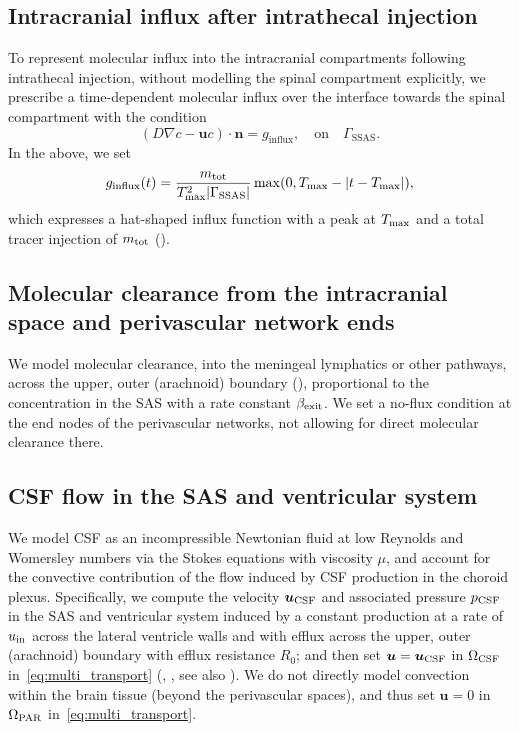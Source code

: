 \documentclass[fleqn,10pt]{wlscirep}
\begin{document}
\subsection*{Intracranial influx after intrathecal injection}
To represent molecular influx into the intracranial compartments
following intrathecal injection, without modelling the spinal
compartment explicitly, we prescribe a time-dependent molecular influx
over the interface towards the spinal compartment with the condition
\begin{equation}
  (D \nabla c - \bm u c ) \cdot \bm{n} = g_{\mathrm{influx}},  \quad \mathrm{on}  \quad \Gamma_{\mathrm{SSAS}}.
\end{equation}
In the above, we set
\begin{equation}
  g_\mathrm{influx}(t) = \frac{m_{\rm tot}}{T_{\rm max}^2 |\Gamma_{\rm SSAS}|} \max(0, T_{\rm max} - |t - T_{\rm max}|), 
\end{equation}
which expresses a hat-shaped influx function with a peak at $T_{\rm max}$ and a total tracer injection of $m_{\rm tot}$ ().

\subsection*{Molecular clearance from the intracranial space and perivascular network ends}

We model molecular clearance, into the meningeal lymphatics or other
pathways, across the upper, outer (arachnoid) boundary
(), proportional to the concentration in the SAS
with a rate constant $\beta_{\rm exit}$. We set a no-flux condition at
the end nodes of the perivascular networks, not allowing for direct
molecular clearance there.

\subsection*{CSF flow in the SAS and ventricular system}

We model CSF as an incompressible Newtonian fluid at low Reynolds and
Womersley numbers via the Stokes equations with viscosity $\mu$, and
account for the convective contribution of the flow induced by CSF
production in the choroid plexus. Specifically, we compute the
velocity $\bm u_{\rm CSF}$ and associated pressure $p_{\rm CSF}$ in
the SAS and ventricular system induced by a constant production at a
rate of $u_{\rm in}$ across the lateral ventricle walls and with
efflux across the upper, outer (arachnoid) boundary with efflux
resistance $R_0$; and then set $\bm u = \bm u_{\rm CSF}$ in
$\Omega_{\rm CSF}$ in~\eqref{eq:multi_transport}
(, , see also
). We do not directly model convection within the
brain tissue (beyond the perivascular spaces), and thus set $\bm u =
0$ in $\Omega_{\rm PAR}$ in~\eqref{eq:multi_transport}.
\end{document}
